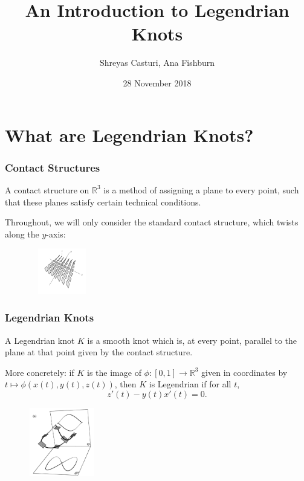 \documentclass{beamer}
\newcommand{\R}{\mathbb{R}}
\begin{document}
\title{An Introduction to Legendrian Knots}
\author{Shreyas Casturi, Ana Fishburn}
\date{28 November 2018}

\frame{\titlepage}

\section[Intro]{What are Legendrian Knots?}

\begin{frame}
    \frametitle{Contact Structures}
    \begin{definition}
    A \alert{contact structure} on $\R^3$ is a method of assigning a plane
    to every point, such that these planes satisfy certain technical conditions.
    \end{definition}

    Throughout, we will only consider the \alert{standard contact structure}, which
    twists along the $y$-axis: \\
    \begin{center}
        \includegraphics[height=2cm,width=5cm]{cStructure.png}
    \end{center}
    
\end{frame}

\begin{frame}
\frametitle{Legendrian Knots}
    \begin{definition}
    A \alert{Legendrian knot} $K$ is a smooth knot which is, at every point, parallel to the
    plane at that point given by the contact structure.
    \end{definition}

    More concretely: if $K$ is the image of $\phi : [0,1] \to \R^3$ given in coordinates by
    $t \mapsto \phi(x(t),y(t),z(t))$, then $K$
    is Legendrian if for all $t$,
    \[ z'(t) - y(t)x'(t) = 0. \]
    \begin{center}
    \includegraphics[height=3cm,width=5cm]{contactLegendrian.png}
    \end{center}

\end{frame}
\end{document}
